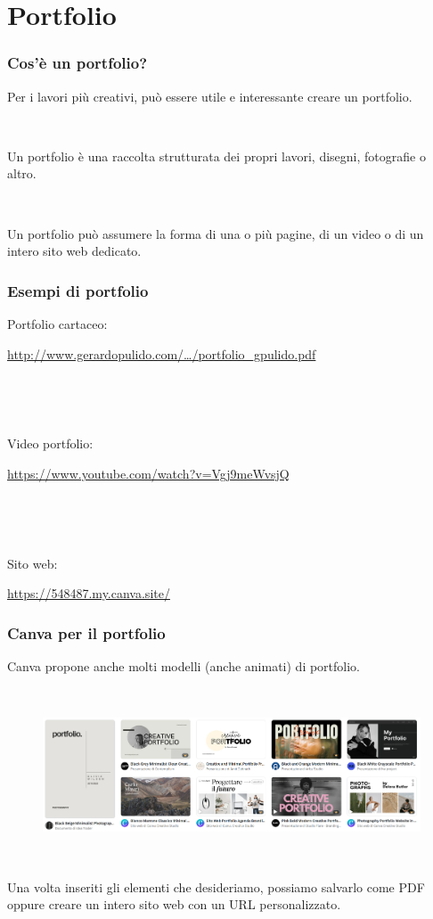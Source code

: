 \documentclass[handout]{beamer}
\begin{document}
\section{Portfolio}

\begin{frame}
\frametitle{Cos'è un portfolio?}
Per i lavori più creativi, può essere utile e interessante creare un portfolio.\pause

~

Un portfolio è una \alert{raccolta strutturata} dei propri lavori, disegni, fotografie o altro.\pause

~

Un portfolio può assumere la forma di una o più pagine, di un video o di un intero sito web dedicato.
\end{frame}

\begin{frame}
\frametitle{Esempi di portfolio}
\begin{center}
  Portfolio cartaceo: 
  
  \href{http://www.gerardopulido.com/uploads/contenidos/portfolio_gpulido.pdf}{http://www.gerardopulido.com/\ldots/portfolio\_gpulido.pdf}

  ~

  ~

  Video portfolio:
  
  \href{https://www.youtube.com/watch?v=Vgj9meWvsjQ}{https://www.youtube.com/watch?v=Vgj9meWvsjQ}

  ~

  ~

  Sito web:
  
  \href{https://548487.my.canva.site/}{https://548487.my.canva.site/}
\end{center}
\end{frame}


\begin{frame}
\frametitle{Canva per il portfolio}
Canva propone anche molti modelli (anche animati) di portfolio.\pause

~

\begin{figure}
  \includegraphics[width=\columnwidth]{img/portfoliocanva.png}
\end{figure}

~

Una volta inseriti gli elementi che desideriamo, possiamo salvarlo come PDF oppure creare un intero sito web con un URL personalizzato.
\end{frame}
\end{document}

